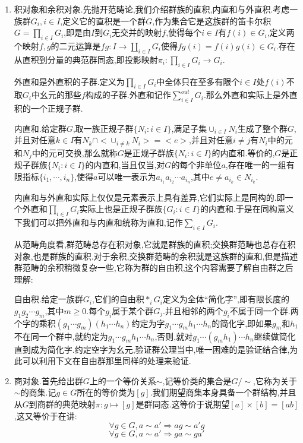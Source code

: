 \begin{enumerate}
	\item
	积对象和余积对象.先抛开范畴论,我们介绍群族的直积,内直和与外直积.考虑一族群$G_i,i\in I$,定义它的直积是一个群$G$,作为集合它是这族群的笛卡尔积$G=\prod_ {i\in I}G_i$,即是由$I$到$G_i$无交并的映射$f$,使得每个$i\in I$有$f(i)\in G_i$,定义两个映射$f,g$的二元运算是$fg:I\to\coprod_ {i\in I}G_i$使得$fg(i)=f(i)g(i)\in G_i$.存在从直积到分量的典范群同态,即投影映射$\pi_i:\prod_{i\in I}G_i\to G_i$.
	
	外直和是外直积的子群.定义为$\prod_{i\in I}G_i$中全体只在至多有限个$i\in I$处$f(i)$不取$G_i$中幺元的那些$f$构成的子群.外直和记作$\sum_{i\in I}^{out}G_i$.那么外直和实际上是外直积的一个正规子群.
	
	内直和.给定群$G$,取一族正规子群$\{N_i:i\in I\}$,满足子集$\cup_{i\in I}N_i$生成了整个群$G$,并且对任意$k\in I$有$N_k\cap<\cup_{i\not=k}N_i>=<e>$,并且对任意$i\not=j$有$N_i$中的元和$N_j$中的元可交换,那么就称$G$是正规子群族$\{N_i:i\in I\}$的内直和.等价的,$G$是正规子群族$\{N_i:i\in I\}$的内直和,当且仅当,对$G$的每个非单位$a$,存在唯一的一组有限指标$\{i_1,\cdots,i_n\}$,使得$a$可以唯一表示为$a_{i_1}a_{i_2}\cdots a_{i_n}$,其中$e\not=a_{i_k}\in N_{i_k}$.
	
	内直和与外直和实际上仅仅是元素表示上具有差异,它们实际上是同构的.即一个外直和$\prod_{i\in I}G_i$实际上也是正规子群族$\{G_i:i\in I\}$的内直和.于是在同构意义下我们可以把外直和与内直和统称为直和,记作$\sum_{i\in I}G_i$.
	
	从范畴角度看,群范畴总存在积对象,它就是群族的直积;交换群范畴也总存在积对象,也是群族的直积.对于余积,交换群范畴的余积就是这族群的直和,但是描述群范畴的余积稍微复杂一些,它称为群的自由积,这个内容需要了解自由群之后理解:
	
	自由积.给定一族群$G_i$,它们的自由积$\ast_iG_i$定义为全体“简化字”,即有限长度的$g_1g_2\cdots g_m$,其中$m\ge0$.每个$g_i$属于某个群$G_j$.并且相邻的两个$g_i$不属于同一个群.两个字的乘积$(g_1\cdots g_m)(h_1\cdots h_n)$约定为字$g_1\cdots g_mh_1\cdots h_n$的简化字,即如果$g_m$和$h_1$不在同一个群中,就约定为$g_1\cdots g_mh_1\cdots h_n$,否则,就对$g_1\cdots (g_mh_1)\cdots h_n$继续做简化直到成为简化字.约定空字为幺元,验证群公理当中,唯一困难的是验证结合律,为此可以利用下文在自由群那里同样的处理来验证.
	\item
	商对象.首先给出群$G$上的一个等价关系$\sim$,记等价类的集合是$G/\sim$,它称为关于$\sim$的商集.记$g\in G$所在的等价类为$[g]$.我们期望商集本身具备一个群结构,并且从$G$到商群的典范映射$\pi:g\mapsto [g]$是群同态.这等价于说期望$[a]\times[b]=[ab]$,这又等价于在讲:
	$$\forall g\in G,a\sim a'\Rightarrow ag\sim a'g$$
	$$\forall g\in G,a\sim a'\Rightarrow ga\sim ga'$$
	

\end{enumerate}
